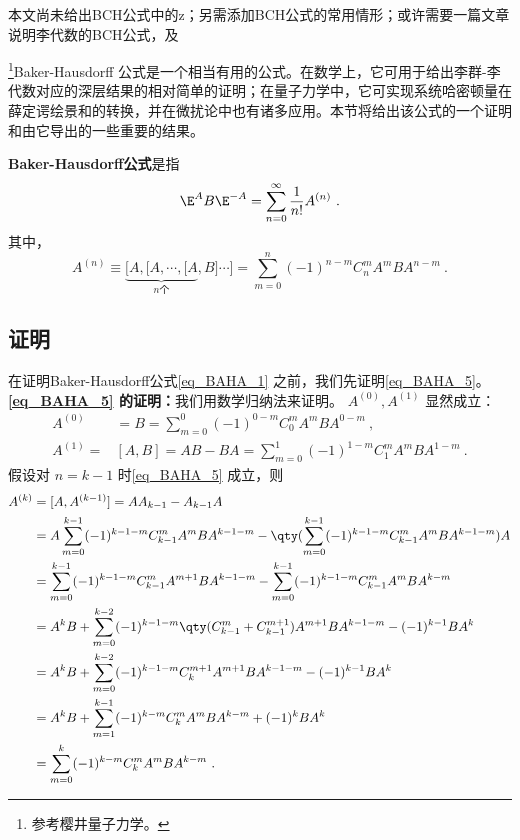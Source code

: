 \begin{issues}
本文尚未给出BCH公式中的z；另需添加BCH公式的常用情形；或许需要一篇文章说明李代数的BCH公式，及
\end{issues}


\footnote{参考樱井量子力学\cite{Sakurai}。}Baker-Hausdorff 公式是一个相当有用的公式。在数学上，它可用于给出李群-李代数对应的深层结果的相对简单的证明；在量子力学中，它可实现系统哈密顿量在薛定谔绘景和的转换，并在微扰论中也有诸多应用。本节将给出该公式的一个证明和由它导出的一些重要的结果。

\textbf{Baker-Hausdorff公式}是指
\begin{equation}\label{eq_BAHA_1}
\E ^{A}B\E^{-A}=\sum_{n=0}^{\infty}\frac{1}{n!}A^{(n)}~.
\end{equation}
其中，
\begin{equation}\label{eq_BAHA_5}
A^{(n)}\equiv\underbrace{[A,[A,\cdots,[A}_{n\text{个}},B]\cdots]
=\sum_{m=0}^{n}(-1)^{n-m}C_{n}^{m}A^mBA^{n-m}~.
\end{equation}


\subsection{证明}
在证明Baker-Hausdorff公式\autoref{eq_BAHA_1} 之前，我们先证明\autoref{eq_BAHA_5}。\\

\textbf{\autoref{eq_BAHA_5} 的证明：}我们用数学归纳法来证明。
$A^{(0)},A^{(1)}$ 显然成立：
\begin{equation}
\begin{aligned}
A^{(0)}&=B=\sum_{m=0}^{0}(-1)^{0-m}C_{0}^{m}A^mBA^{0-m}~,\\
A^{(1)}=&[A,B]=AB-BA=\sum_{m=0}^{1}(-1)^{1-m}C_{1}^{m}A^mBA^{1-m}~.
\end{aligned}
\end{equation}
假设对 $n=k-1$ 时\autoref{eq_BAHA_5} 成立，则
\begin{equation}
\begin{aligned}
A^{(k)}&=[A,A^{(k-1)}]=AA_{k-1}-A_{k-1}A\\
&=A\sum_{m=0}^{k-1}(-1)^{k-1-m}C_{k-1}^{m}A^mBA^{k-1-m}-\qty(\sum_{m=0}^{k-1}(-1)^{k-1-m}C_{k-1}^{m}A^mBA^{k-1-m})A\\
&=\sum_{m=0}^{k-1}(-1)^{k-1-m}C_{k-1}^{m}A^{m+1}BA^{k-1-m}-\sum_{m=0}^{k-1}(-1)^{k-1-m}C_{k-1}^{m}A^mBA^{k-m}\\
&=A^{k}B+\sum_{m=0}^{k-2}(-1)^{k-1-m}\qty(C_{k-1}^{m}+C_{k-1}^{m+1})A^{m+1}BA^{k-1-m}-(-1)^{k-1}BA^k\\
&=A^{k}B+\sum_{m=0}^{k-2}(-1)^{k-1-m}C_{k}^{m+1}A^{m+1}BA^{k-1-m}-(-1)^{k-1}BA^k\\
&=A^{k}B+\sum_{m=1}^{k-1}(-1)^{k-m}C_{k}^{m}A^{m}BA^{k-m}+(-1)^{k}BA^k\\
&=\sum_{m=0}^{k}(-1)^{k-m}C_{k}^{m}A^{m}BA^{k-m}~.
\end{aligned}
\end{equation}


